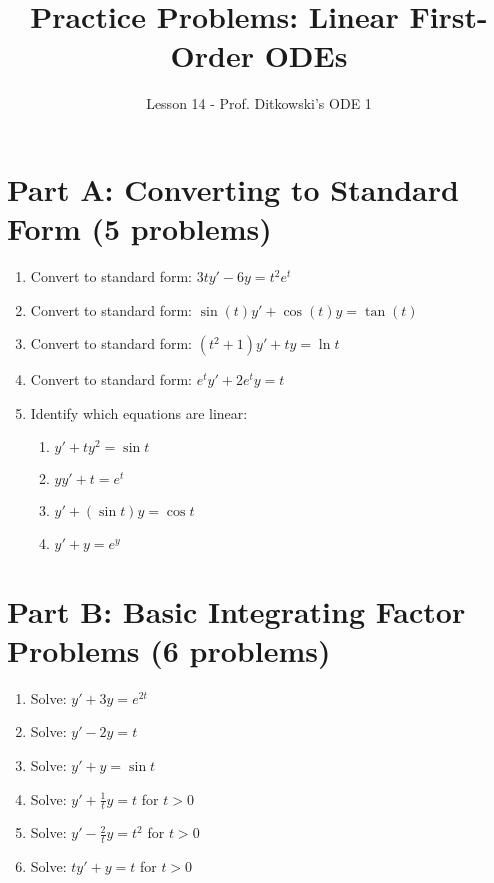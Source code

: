 \documentclass[12pt]{article}
\title{Practice Problems: Linear First-Order ODEs}
\author{Lesson 14 - Prof. Ditkowski's ODE 1}
\date{}
\begin{document}
\maketitle

\section*{Part A: Converting to Standard Form (5 problems)}

\begin{enumerate}
\item Convert to standard form: $3ty' - 6y = t^2e^t$

\item Convert to standard form: $\sin(t)y' + \cos(t)y = \tan(t)$

\item Convert to standard form: $(t^2 + 1)y' + ty = \ln t$

\item Convert to standard form: $e^t y' + 2e^t y = t$

\item Identify which equations are linear:
\begin{enumerate}
\item $y' + ty^2 = \sin t$
\item $yy' + t = e^t$
\item $y' + (\sin t)y = \cos t$
\item $y' + y = e^y$
\end{enumerate}
\end{enumerate}

\section*{Part B: Basic Integrating Factor Problems (6 problems)}

\begin{enumerate}[resume]
\item Solve: $y' + 3y = e^{2t}$

\item Solve: $y' - 2y = t$

\item Solve: $y' + y = \sin t$

\item Solve: $y' + \frac{1}{t}y = t$ for $t > 0$

\item Solve: $y' - \frac{2}{t}y = t^2$ for $t > 0$

\item Solve: $ty' + y = t$ for $t > 0$
\end{enumerate}
\end{document}
